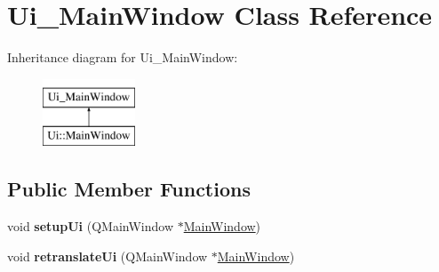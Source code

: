 \hypertarget{classUi__MainWindow}{}\section{Ui\+\_\+\+Main\+Window Class Reference}
\label{classUi__MainWindow}
Inheritance diagram for Ui\+\_\+\+Main\+Window\+:\begin{figure}[H]
\begin{center}
\leavevmode
\includegraphics[height=2.000000cm]{classUi__MainWindow}
\end{center}
\end{figure}
\subsection*{Public Member Functions}
\begin{DoxyCompactItemize}
\item 
void {\bfseries setup\+Ui} (Q\+Main\+Window $\ast$\hyperlink{classMainWindow}{Main\+Window})\hypertarget{classUi__MainWindow_acf4a0872c4c77d8f43a2ec66ed849b58}{}\label{classUi__MainWindow_acf4a0872c4c77d8f43a2ec66ed849b58}

\item 
void {\bfseries retranslate\+Ui} (Q\+Main\+Window $\ast$\hyperlink{classMainWindow}{Main\+Window})\hypertarget{classUi__MainWindow_a097dd160c3534a204904cb374412c618}{}\label{classUi__MainWindow_a097dd160c3534a204904cb374412c618}

\end{DoxyCompactItemize}

